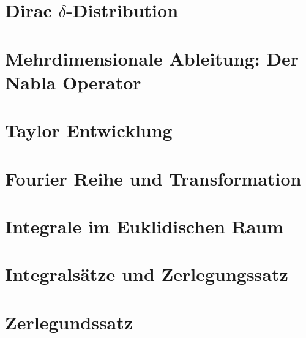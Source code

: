 
\section{Dirac $\delta$-Distribution}%
\label{sec:dirac-delta-distribution}


\newpage
\section{Mehrdimensionale Ableitung: Der Nabla Operator}%
\label{sec:mehrdimensionale-mbleitung}


\newpage
\section{Taylor Entwicklung}%
\label{sec:taylor-entwicklung}


\newpage
\section{Fourier Reihe und Transformation}%


\newpage
\section{Integrale im Euklidischen Raum}%
\label{sec:raum-integrale}

\newpage
\section{Integralsätze und Zerlegungssatz}%
\label{sec:integralsaetze}

\newpage
\section{Zerlegundssatz}%
\label{sec:zerlegundssatz}
